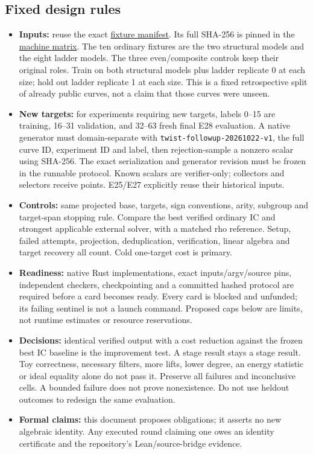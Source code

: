 \documentclass[
  10pt,
]{article}
\providecommand{\tightlist}{%
  \setlength{\itemsep}{0pt}\setlength{\parskip}{0pt}}
\begin{document}
\subsection{Fixed design rules}\label{fixed-design-rules}

\begin{itemize}
\tightlist
\item
  \textbf{Inputs:} reuse the exact
  \href{../execution-v1/fixtures.json}{fixture manifest}. Its full
  SHA-256 is pinned in the \href{experiments.json}{machine matrix}. The
  ten ordinary fixtures are the two structural models and the eight
  ladder models. The three even/composite controls keep their original
  roles. Train on both structural models plus ladder replicate 0 at each
  size; hold out ladder replicate 1 at each size. This is a fixed
  retrospective split of already public curves, not a claim that those
  curves were unseen.
\item
  \textbf{New targets:} for experiments requiring new targets, labels
  0--15 are training, 16--31 validation, and 32--63 fresh final E28
  evaluation. A native generator must domain-separate with
  \texttt{twist-followup-20261022-v1}, the full curve ID, experiment ID
  and label, then rejection-sample a nonzero scalar using SHA-256. The
  exact serialization and generator revision must be frozen in the
  runnable protocol. Known scalars are verifier-only; collectors and
  selectors receive points. E25/E27 explicitly reuse their historical
  inputs.
\item
  \textbf{Controls:} same projected base, targets, sign conventions,
  arity, subgroup and target-span stopping rule. Compare the best
  verified ordinary IC and strongest applicable external solver, with a
  matched rho reference. Setup, failed attempts, projection,
  deduplication, verification, linear algebra and target recovery all
  count. Cold one-target cost is primary.
\item
  \textbf{Readiness:} native Rust implementations, exact
  inputs/argv/source pins, independent checkers, checkpointing and a
  committed hashed protocol are required before a card becomes ready.
  Every card is blocked and unfunded; its failing sentinel is not a
  launch command. Proposed caps below are limits, not runtime estimates
  or resource reservations.
\item
  \textbf{Decisions:} identical verified output with a cost reduction
  against the frozen best IC baseline is the improvement test. A stage
  result stays a stage result. Toy correctness, necessary filters, more
  lifts, lower degree, an energy statistic or ideal equality alone do
  not pass it. Preserve all failures and inconclusive cells. A bounded
  failure does not prove nonexistence. Do not use heldout outcomes to
  redesign the same evaluation.
\item
  \textbf{Formal claims:} this document proposes obligations; it asserts
  no new algebraic identity. Any executed round claiming one owes an
  identity certificate and the repository's Lean/source-bridge evidence.
\end{itemize}
\end{document}
